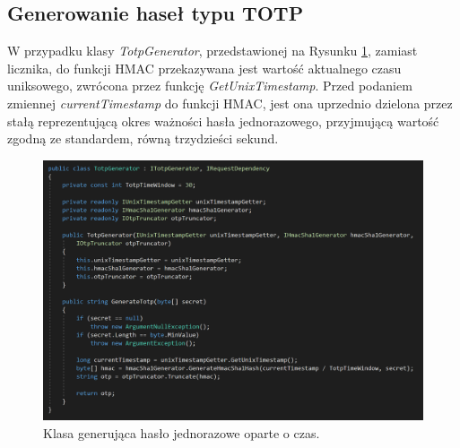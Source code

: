 \subsection{Generowanie haseł typu TOTP}
W przypadku klasy \textit{TotpGenerator}, przedstawionej na Rysunku \ref{code-totp}, zamiast licznika, do funkcji HMAC
przekazywana jest wartość aktualnego czasu uniksowego, zwrócona przez funkcję \textit{GetUnixTimestamp}. 
Przed podaniem zmiennej \textit{currentTimestamp} do funkcji HMAC, jest ona uprzednio dzielona przez stałą 
reprezentującą okres ważności hasła jednorazowego, przyjmującą wartość zgodną ze standardem, równą trzydzieści sekund.
\begin{figure}[t]
    \centering
	\includegraphics[width=\textwidth]{content/images/code-totpgenerator}
    \caption{Klasa generująca hasło jednorazowe oparte o czas.}
    \label{code-totp}
\end{figure}

